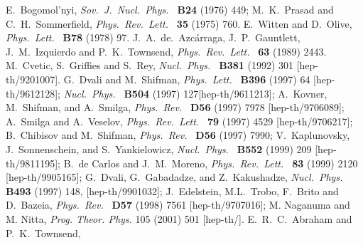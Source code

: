 \documentclass[a4paper,12pt]{article}
\begin{document}


\begin{thebibliography}{100}
 
   E.~Bogomol'nyi, 
             {\it Sov.\ J.\ Nucl.\ Phys.\ } {\bf B24} (1976) 449;
                M.~K.~Prasad and C.~H.~Sommerfield, 
             {\it Phys.\ Rev.\ Lett.\ } {\bf 35} (1975) 760.
%
 E.~Witten and D.~Olive, 
             {\it Phys.\ Lett.\ } {\bf B78} (1978) 97.
%
 J.~A.~de.~Azc\'{a}rraga, J.~P.~Gauntlett, J.~M.~Izquierdo 
                    and P.~K.~Townsend, 
             {\it Phys.\ Rev.\ Lett.\ } {\bf 63} (1989) 2443.
 M.~Cvetic, S.~Griffies and S.~Rey,
             {\it Nucl.\ Phys.\ } {\bf B381} (1992) 301 
             [hep-th/9201007].
%
G.~Dvali and M.~Shifman, 
             {\it Phys.\ Lett.\ } {\bf B396} (1997) 64 [hep-th/9612128]; 
             {\it Nucl.\ Phys.\ } {\bf B504} (1997) 127[hep-th/9611213]; 
             A.~Kovner, M.~Shifman, and A.~Smilga, 
            {\it Phys.\ Rev.\ } {\bf D56} (1997) 7978 
            [hep-th/9706089]; 
            A.~Smilga and A.~Veselov, 
            {\it Phys.\ Rev.\ Lett.\ } {\bf 79} (1997) 4529 
            [hep-th/9706217]; B.~Chibisov and M.~Shifman, 
            {\it Phys.\ Rev.\ } {\bf D56} (1997) 7990; 
             V.~Kaplunovsky, J.~Sonnenschein, and 
             S.~Yankielowicz, 
             {\it Nucl.\ Phys.\ } {\bf B552} (1999) 209 
             [hep-th/9811195];
             B.~de Carlos and J.~M.~Moreno,
            {\it Phys.\ Rev.\ Lett.\ } {\bf 83} (1999) 2120 
            [hep-th/9905165];
            G.~Dvali, G.~Gabadadze, and Z.~Kakushadze, 
            {\it Nucl.\ Phys.\ } {\bf B493} (1997) 148,
             [hep-th/9901032];
            J.~Edelstein, M.L.~Trobo, F.~Brito and D.~Bazeia, 
            {\it Phys.\ Rev.\ } {\bf D57} (1998) 7561 
            [hep-th/9707016];
            M. Naganuma and M. Nitta,
            {\em Prog. Theor. Phys.} {105} (2001) 501
            [hep-th/].
%
%
  E.~R.~C.~Abraham and P.~K.~Townsend, 

\end{thebibliography}
\end{document}
